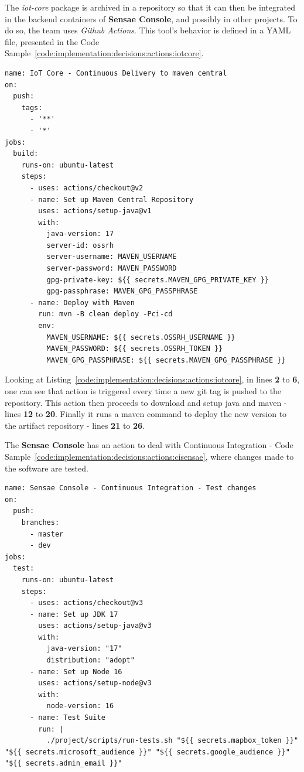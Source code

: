 The \textit{iot-core} package is archived in a repository so that it can then be integrated in the backend containers of \textbf{Sensae Console}, and possibly in other projects. To do so, the team uses \textit{Github Actions}. This tool's behavior is defined in a YAML file, presented in the Code Sample~\ref{code:implementation:decisions:actions:iotcore}.

\begin{lstlisting}[style=yaml, caption=Configuration File for \textit{iot-core} Continuous Delivery, label={code:implementation:decisions:actions:iotcore}]
name: IoT Core - Continuous Delivery to maven central
on:
  push:
    tags:
      - '**'
      - '*'
jobs:
  build:
    runs-on: ubuntu-latest
    steps:
      - uses: actions/checkout@v2
      - name: Set up Maven Central Repository
        uses: actions/setup-java@v1
        with:
          java-version: 17
          server-id: ossrh
          server-username: MAVEN_USERNAME
          server-password: MAVEN_PASSWORD
          gpg-private-key: ${{ secrets.MAVEN_GPG_PRIVATE_KEY }}
          gpg-passphrase: MAVEN_GPG_PASSPHRASE
      - name: Deploy with Maven
        run: mvn -B clean deploy -Pci-cd
        env:
          MAVEN_USERNAME: ${{ secrets.OSSRH_USERNAME }}
          MAVEN_PASSWORD: ${{ secrets.OSSRH_TOKEN }}
          MAVEN_GPG_PASSPHRASE: ${{ secrets.MAVEN_GPG_PASSPHRASE }}
\end{lstlisting}

Looking at Listing~\ref{code:implementation:decisions:actions:iotcore}, in lines \textbf{2} to \textbf{6}, one can see that action is triggered every time a new git tag is pushed to the repository.
This action then proceeds to download and setup java and maven - lines \textbf{12} to \textbf{20}. Finally it runs a maven command to deploy the new version to the artifact repository - lines \textbf{21} to \textbf{26}.

The \textbf{Sensae Console} has an action to deal with Continuous Integration - Code Sample~\ref{code:implementation:decisions:actions:cisensae}, where changes made to the software are tested.

\begin{lstlisting}[style=yaml, caption=Configuration File for Sensae Console Continuous Integration, label={code:implementation:decisions:actions:cisensae}]
name: Sensae Console - Continuous Integration - Test changes
on:
  push:
    branches:
      - master
      - dev
jobs:
  test:
    runs-on: ubuntu-latest
    steps:
      - uses: actions/checkout@v3
      - name: Set up JDK 17
        uses: actions/setup-java@v3
        with:
          java-version: "17"
          distribution: "adopt"
      - name: Set up Node 16
        uses: actions/setup-node@v3
        with:
          node-version: 16
      - name: Test Suite
        run: |
          ./project/scripts/run-tests.sh "${{ secrets.mapbox_token }}" "${{ secrets.microsoft_audience }}" "${{ secrets.google_audience }}" "${{ secrets.admin_email }}"

\end{lstlisting}

